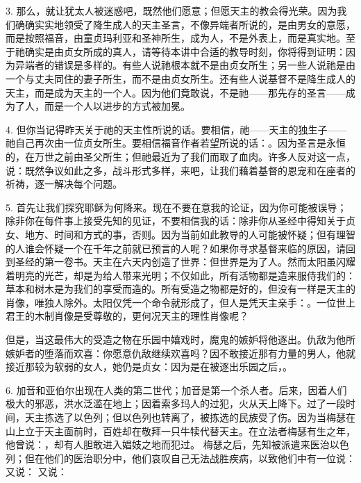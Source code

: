 3. 那么，就让犹太人被迷惑吧，既然他们愿意；但愿天主的教会得光荣。因为我们确确实实地领受了降生成人的天主圣言，不像异端者所说的，是由男女的意愿，而是按照福音，由童贞玛利亚和圣神所生，成为人，不是外表上，而是真实地。至于祂确实是由贞女所成的真人，请等待本讲中合适的教导时刻，你将得到证明：因为异端者的错误是多样的。有些人说祂根本就不是由贞女所生；另一些人说祂是由一个与丈夫同住的妻子所生，而不是由贞女所生。还有些人说基督不是降生成人的天主，而是成为天主的一个人。因为他们竟敢说，不是祂——那先存的圣言——成为了人，而是一个人以进步的方式被加冕。\par

4. 但你当记得昨天关于祂的天主性所说的话。要相信，祂——天主的独生子——祂自己再次由一位贞女所生。要相信福音作者若望所说的话：。因为圣言是永恒的，在万世之前由圣父所生；但祂最近为了我们而取了血肉。许多人反对这一点，说：既然争议如此之多，战斗形式多样，来吧，让我们藉着基督的恩宠和在座者的祈祷，逐一解决每个问题。\par

5. 首先让我们探究耶稣为何降来。现在不要在意我的论证，因为你可能被误导；除非你在每件事上接受先知的见证，不要相信我的话：除非你从圣经中得知关于贞女、地方、时间和方式的事，否则。因为当前如此教导的人可能被怀疑；但有理智的人谁会怀疑一个在千年之前就已预言的人呢？如果你寻求基督来临的原因，请回到圣经的第一卷书。天主在六天内创造了世界：但世界是为了人。然而太阳虽闪耀着明亮的光芒，却是为给人带来光明；不仅如此，所有活物都是造来服侍我们的：草本和树木是为我们的享受而造的。所有受造之物都是好的，但没有一样是天主的肖像，唯独人除外。太阳仅凭一个命令就形成了，但人是凭天主亲手：。一位世上君王的木制肖像是受尊敬的，更何况天主的理性肖像呢？\par

但是，当这最伟大的受造之物在乐园中嬉戏时，魔鬼的嫉妒将他逐出。仇敌为他所嫉妒者的堕落而欢喜：你愿意仇敌继续欢喜吗？因不敢接近那有力量的男人，他就接近那较为软弱的女人，她仍是贞女：因为是在被逐出乐园之后，。\par

6. 加音和亚伯尔出现在人类的第二世代；加音是第一个杀人者。后来，因着人们极大的邪恶，洪水泛滥在地上；因着索多玛人的过犯，火从天上降下。过了一段时间，天主拣选了以色列；但以色列也转离了，被拣选的民族受了伤。因为当梅瑟在山上立于天主面前时，百姓却在敬拜一只牛犊代替天主。在立法者梅瑟有生之年，他曾说：，却有人胆敢进入娼妓之地而犯过。 梅瑟之后，先知被派遣来医治以色列；但在他们的医治职分中，他们哀叹自己无法战胜疾病，以致他们中有一位说： 又说： 又说：   \par

